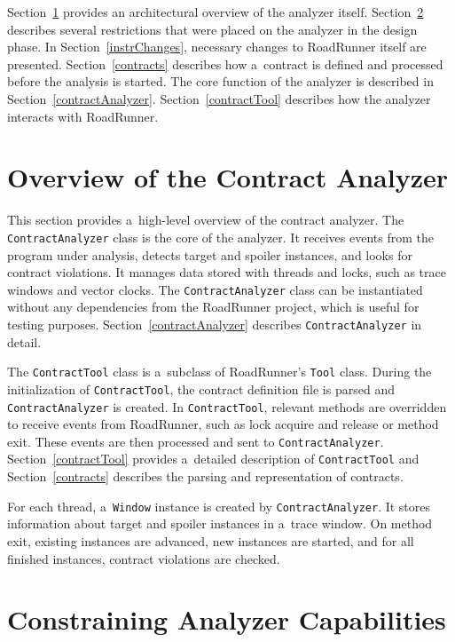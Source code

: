 Section~\ref{overview} provides an architectural overview of the analyzer
itself. Section~\ref{constraining} describes several restrictions that were
placed on the analyzer in the design phase. In Section~\ref{instrChanges},
necessary changes to RoadRunner itself are presented. Section~\ref{contracts}
describes how a~contract is defined and processed before the analysis is
started. The core function of the analyzer is described in
Section~\ref{contractAnalyzer}. Section~\ref{contractTool} describes how the
analyzer interacts with RoadRunner.

\section{Overview of the Contract Analyzer}
\label{overview}

This section provides a~high-level overview of the contract analyzer. The
\texttt{ContractAnalyzer} class is the core of the analyzer. It receives events
from the program under analysis, detects target and spoiler instances, and looks
for contract violations. It manages data stored with threads and locks, such as
trace windows and vector clocks. The \texttt{ContractAnalyzer} class can be
instantiated without any dependencies from the RoadRunner project, which is
useful for testing purposes. Section~\ref{contractAnalyzer} describes
\texttt{ContractAnalyzer} in detail.

The \texttt{ContractTool} class is a~subclass of RoadRunner's \texttt{Tool}
class. During the initialization of \texttt{ContractTool}, the contract
definition file is parsed and \texttt{ContractAnalyzer} is created. In
\texttt{ContractTool}, relevant methods are overridden to receive events from
RoadRunner, such as lock acquire and release or method exit. These events are
then processed and sent to \texttt{ContractAnalyzer}. Section~\ref{contractTool}
provides a~detailed description of \texttt{ContractTool} and
Section~\ref{contracts} describes the parsing and representation of contracts.

For each thread, a~\texttt{Window} instance is created by
\texttt{ContractAnalyzer}. It stores information about target and spoiler
instances in a~trace window. On method exit, existing instances are advanced,
new instances are started, and for all finished instances, contract violations
are checked.

\section{Constraining Analyzer Capabilities}
\label{constraining}

